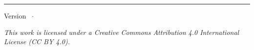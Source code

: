 \begin{titlepage}
  \centering
  \vspace*{2cm}
  {\huge\bfseries\color{tccdNavy}\booktitle\par}
  \vspace{0.5cm}
  {\Large\color{tccdDarkGray}\booksubtitle\par}
  \vspace{1cm}
  \textcolor{tccdGold}{\rule{0.5\textwidth}{2pt}}\par
  \vspace{1cm}
  {\large\bookauthors\par}
  \vspace{0.5cm}
  {\normalsize\bookcourse\par}
  \vfill
  {\small Version \bookversion\ $\cdot$ \bookyear\par}
  \vspace{0.5cm}
  {\small\textit{This work is licensed under a Creative Commons
    Attribution 4.0 International License (CC BY 4.0).}\par}
\end{titlepage}
